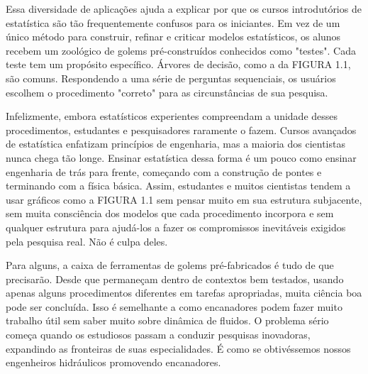 Essa diversidade de aplicações ajuda a explicar por que os cursos introdutórios de estatística são tão frequentemente confusos para os iniciantes. Em vez de um único método para construir, refinar e criticar modelos estatísticos, os alunos recebem um zoológico de golems pré-construídos conhecidos como "testes". Cada teste tem um propósito específico. Árvores de decisão, como a da FIGURA 1.1, são comuns. Respondendo a uma série de perguntas sequenciais, os usuários escolhem o procedimento "correto" para as circunstâncias de sua pesquisa.

Infelizmente, embora estatísticos experientes compreendam a unidade desses procedimentos, estudantes e pesquisadores raramente o fazem. Cursos avançados de estatística enfatizam princípios de engenharia, mas a maioria dos cientistas nunca chega tão longe. Ensinar estatística dessa forma é um pouco como ensinar engenharia de trás para frente, começando com a construção de pontes e terminando com a física básica. Assim, estudantes e muitos cientistas tendem a usar gráficos como a FIGURA 1.1 sem pensar muito em sua estrutura subjacente, sem muita consciência dos modelos que cada procedimento incorpora e sem qualquer estrutura para ajudá-los a fazer os compromissos inevitáveis exigidos pela pesquisa real. Não é culpa deles.

Para alguns, a caixa de ferramentas de golems pré-fabricados é tudo de que precisarão. Desde que permaneçam dentro de contextos bem testados, usando apenas alguns procedimentos diferentes em tarefas apropriadas, muita ciência boa pode ser concluída. Isso é semelhante a como encanadores podem fazer muito trabalho útil sem saber muito sobre dinâmica de fluidos. O problema sério começa quando os estudiosos passam a conduzir pesquisas inovadoras, expandindo as fronteiras de suas especialidades. É como se obtivéssemos nossos engenheiros hidráulicos promovendo encanadores.

